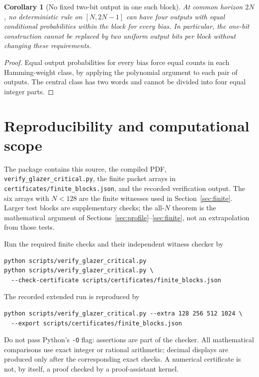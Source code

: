 \documentclass[11pt]{article}
\newtheorem{corollary}[theorem]{Corollary}
\theoremstyle{definition}
\theoremstyle{remark}
\begin{document}
\begin{corollary}[No fixed two-bit output in one such block]\label{cor:no-two-bit}
At common horizon $2N$, no deterministic rule on $[N,2N-1]$ can have four
outputs with equal conditional probabilities within the block for every
bias. In particular, the one-bit construction cannot be replaced by two
uniform output bits per block without changing these requirements.
\end{corollary}
\begin{proof}
Equal output probabilities for every bias force equal counts in each
Hamming-weight class, by applying the polynomial argument to each pair
of outputs. The central class has two words and cannot be divided into
four equal integer parts.
\end{proof}

\section*{Reproducibility and computational scope}

The package contains this source, the compiled PDF,
\texttt{verify\_glazer\_critical.py}, the finite packet arrays in
\texttt{certificates/finite\_blocks.json}, and the recorded verification
output. The six arrays with $N<128$ are the finite witnesses used in
Section~\ref{sec:finite}. Larger test blocks are supplementary checks;
the all-$N$ theorem is the mathematical argument of
Sections~\ref{sec:profile}--\ref{sec:finite}, not an extrapolation from
those tests.

Run the required finite checks and their independent witness checker by
\begin{verbatim}
python scripts/verify_glazer_critical.py
python scripts/verify_glazer_critical.py \
  --check-certificate scripts/certificates/finite_blocks.json
\end{verbatim}
The recorded extended run is reproduced by
\begin{verbatim}
python scripts/verify_glazer_critical.py --extra 128 256 512 1024 \
  --export scripts/certificates/finite_blocks.json
\end{verbatim}
Do not pass Python's \texttt{-O} flag: assertions are part of the checker.
All mathematical comparisons use exact integer or rational arithmetic;
decimal displays are produced only after the corresponding exact checks.
A numerical certificate is not, by itself, a proof checked by a
proof-assistant kernel.
\end{document}
